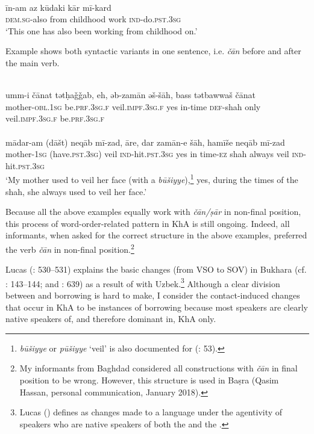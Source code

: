 \documentclass[output=paper,nonflat]{langsci/langscibook}
\begin{document}
\\
\gll īn-am az kūdaki kār mī-kard \\
     \textsc{dem.sg}-also from childhood work \textsc{ind}{}-do.\textsc{pst.3sg}\\
\glt ‘This one has also been working from childhood on.’
\z\z

Example  shows both syntactic variants in one sentence, i.e. \textit{čān} before and after the main verb.

\ea\label{mother} \\
\gll umm-i čānat tətḥaǧǧab, eh, əb-zamān əš-šāh, bass tətbawwaš čānat\\
     mother-\textsc{obl.1sg} be\textsc{.prf.3sg.f} veil.\textsc{impf.3sg.f} yes in-time \textsc{def}{}-shah only veil.\textsc{impf.3sg.f} be\textsc{.prf.3sg.f}\\
\newpage 
{}\\
\gll mādar-am (dāšt) neqāb mī-zad, āre, dar zamān-e šāh, hamīše neqāb mī-zad \\
     mother-\textsc{1sg} (have.\textsc{pst.3sg}) veil \textsc{ind}-hit.\textsc{pst.3sg} yes in time-\textsc{ez} shah always veil \textsc{ind}-hit.\textsc{pst.3sg}\\
\glt  ‘My mother used to veil her face (with a \textit{būšiyye}),\footnote{\textit{būšiyye} or \textit{pūšiyye} ‘veil’ is also documented for   (\citealt{WoodheadEtAl1967}: 53).} yes, during the times of the shah, she always used to veil her face.’ 
\z\z

Because all the above examples equally work with \textit{čān/ṣār} in non-final position, this process of word-order-related pattern  in KhA is still ongoing. Indeed, all informants, when asked for the correct structure in the above examples, preferred the verb \textit{čān} in non-final position.\footnote{My informants from Baghdad considered all constructions with \textit{čān} in final position to be wrong. However, this structure is used in Baṣra  (Qasim Hassan, personal communication, January 2018).}

Lucas (\citeyear{Lucas2015}: 530–531) explains the basic  changes (from VSO to SOV) in Bukhara  (cf. \citealt{Ratcliffe2005}: 143–144; and \citealt{Versteegh2010}: 639) as a result of  with Uzbek.\footnote{Lucas (\citeyear[525]{Lucas2015}) defines  as changes made to a language under the agentivity of speakers who are native speakers of both the  and the .} Although a clear division between  and borrowing is hard to make, I consider the contact-induced  changes that occur in KhA to be instances of borrowing because most speakers are clearly native speakers of, and therefore dominant in, KhA only.
\end{document}
